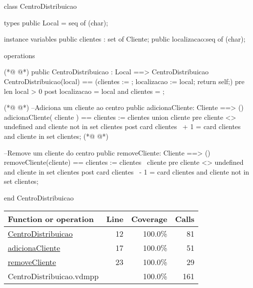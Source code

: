 \begin{vdmpp}[breaklines=true]
class CentroDistribuicao

types 
 public Local = seq of (char);

instance variables
 public clientes : set of Cliente;
  public localizacao:seq of (char);
 
operations
  
(*@
\label{CentroDistribuicao:12}
@*)
  public  CentroDistribuicao : Local ==> CentroDistribuicao
  CentroDistribuicao(local) == (clientes := {}; localizacao := local; return self;)
  pre len local > 0
  post localizacao = local and clientes = {};
 
(*@
\label{adicionaCliente:17}
@*)
 --Adiciona um cliente ao centro
 public adicionaCliente: Cliente ==> () 
 adicionaCliente( cliente ) == 
   clientes := clientes union {cliente}
 pre cliente <> undefined and cliente not in set clientes
 post card clientes~ + 1 = card clientes and cliente in set clientes;  
(*@
\label{removeCliente:23}
@*)
 
 
 --Remove um cliente do centro
 public removeCliente: Cliente ==> () 
 removeCliente(cliente) == 
   clientes := clientes \ {cliente}
 pre cliente <> undefined and cliente in set clientes
 post card clientes~ - 1 = card clientes and cliente not in set clientes; 
 
end CentroDistribuicao
\end{vdmpp}
\bigskip
\begin{longtable}{|l|r|r|r|}
\hline
Function or operation & Line & Coverage & Calls \\
\hline
\hline
\hyperref[CentroDistribuicao:12]{CentroDistribuicao} & 12&100.0\% & 81 \\
\hline
\hyperref[adicionaCliente:17]{adicionaCliente} & 17&100.0\% & 51 \\
\hline
\hyperref[removeCliente:23]{removeCliente} & 23&100.0\% & 29 \\
\hline
\hline
CentroDistribuicao.vdmpp & & 100.0\% & 161 \\
\hline
\end{longtable}

